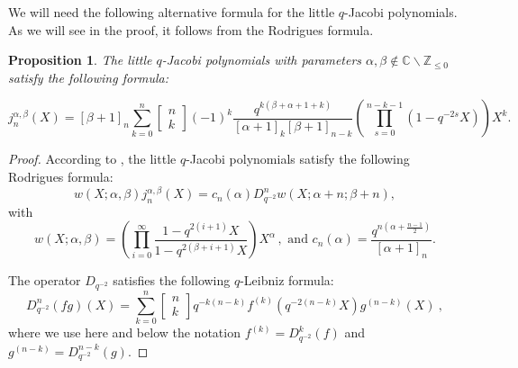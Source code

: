 \documentclass[a4paper,12pt]{article}
\numberwithin{equation}{section}
\newcommand{\C}{\mathbb{C}}
\newcommand{\Z}{\mathbb{Z}}
\newcommand{\qbinom}[2]{\begin{bmatrix}#1\\#2\end{bmatrix}}
\newtheorem{prop}[theo]{Proposition}
\theoremstyle{rem}
\theoremstyle{definition}
\begin{document}
 We will need the following alternative formula for the little $q$-Jacobi polynomials. As we will see in the proof, it follows from the Rodrigues formula.
\begin{prop}\label{prop_formulasRodrigues}
The little $q$-Jacobi polynomials with parameters $\alpha, \beta \notin \C\backslash \Z_{\leq 0}$ satisfy the following formula:

\begin{equation}
j_n^{\alpha,\beta}(X)=[\beta+1]_n\sum_{k=0}^n \qbinom{n}{k}(-1)^k \frac{q^{k(\beta+\alpha+1+k)}}{[\alpha+1]_k[\beta+1]_{n-k}} \left(\prod_{s=0}^{n-k-1}(1-q^{-2s}X)\right)X^k.
\end{equation}

\end{prop}

\begin{proof}
According to \cite{KLS10}, the little $q$-Jacobi polynomials satisfy the following Rodrigues formula:
\begin{equation}\label{Rodrigues}
w(X;\alpha,\beta)j_n^{\alpha,\beta}(X)=c_n(\alpha)  D_{q^{-2}}^n w(X; \alpha+n;\beta+n),
\end{equation}
with
\begin{equation}
w(X;\alpha,\beta)=\left(\prod_{i=0}^\infty \frac{1-q^{2(i+1)}X}{1-q^{2(\beta+i+1)}X}\right)X^\alpha\,, \text{ and } c_n(\alpha)=\frac{q^{n(\alpha+\frac{n-1}{2})}}{[\alpha+1]_n}.
\end{equation}

The operator $D_{q^{-2}}$ satisfies the following $q$-Leibniz formula:
\begin{equation*}
D_{q^{-2}}^n(fg)(X)=\sum_{k=0}^n \qbinom{n}{k} q^{-k(n-k)}f^{(k)}(q^{-2(n-k)}X)g^{(n-k)}(X)\ , 
\end{equation*}
where we use here and below the notation $f^{(k)}=D_{q^{-2}}^{k}(f)$ and $g^{(n-k)}=D_{q^{-2}}^{n-k}(g)$.


\end{proof}
\end{document}
